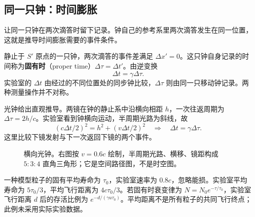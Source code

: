 \subsection{同一只钟：时间膨胀}
让同一只钟在两次滴答时留下记录。钟自己的参考系里两次滴答发生在同一位置，这就是推导时间膨胀需要的事件条件。

静止于 $S'$ 原点的一只钟，两次滴答的事件差满足 $\Delta x'=0$。这只钟自身记录的时间称为\textbf{固有时}（proper time）$\Delta\tau=\Delta t'$。由逆变换
\begin{equation}\label{eq:sr-time}
\boxed{\Delta t=\gamma\Delta\tau.}
\end{equation}
实验室的 $\Delta t$ 由经过的不同位置处的同步钟比较，$\Delta\tau$ 则由同一只移动钟记录。两种测量操作并不对称。

光钟给出直观推导。两镜在钟的静止系中沿横向相距 $h$，一次往返周期为 $\Delta\tau=2h/c$。实验室看到钟横向运动，半周期光路为斜线，故
\[
(c\Delta t/2)^2=h^2+(v\Delta t/2)^2
\quad\Longrightarrow\quad \Delta t=\gamma\Delta\tau.
\]
这里比较下镜发射与下一次返回下镜的两个事件。
\begin{figure}[htbp]\centering
{}
\caption{横向光钟。右图按 $v=0.6c$ 绘制，半周期光路、横移、镜距构成 $5:3:4$ 直角三角形；它是空间路径图，不是时空图。}\label{fig:sr-lightclock}
\end{figure}

\begin{example}[寿命与飞行距离]
一种模型粒子的固有平均寿命为 $\tau_0$，实验室速率为 $0.8c$，忽略能损。实验室平均寿命为 $5\tau_0/3$，平均飞行距离为 $4c\tau_0/3$。若固有时衰变律为 $N=N_0e^{-\tau/\tau_0}$，实验室飞行距离 $d$ 后的存活比例为 $e^{-d/(\gamma u\tau_0)}$。平均距离不是所有粒子的共同飞行终点；此例未采用实际实验数据。
\end{example}

